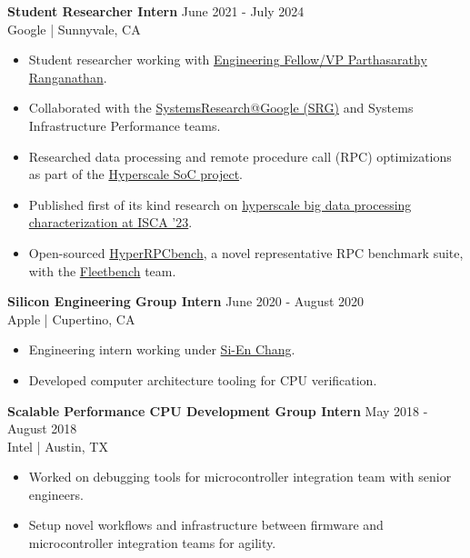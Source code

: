 \documentclass[line]{res}
\begin{document}
\begin{resume}
\textbf{Student Researcher Intern} \hfill June 2021 - July 2024
\\
Google | Sunnyvale, CA
\\
\vspace{-3mm}
\begin{itemize}
\item Student researcher working with \href{https://www.parthasarathys.com/}{Engineering Fellow/VP Parthasarathy Ranganathan}.
\item Collaborated with the \href{https://techsysinfra.google/research/}{SystemsResearch@Google (SRG)} and Systems Infrastructure Performance teams.
\item Researched data processing and remote procedure call (RPC) optimizations as part of the \hyperref[sec:hyperscale-soc]{Hyperscale SoC project}.
\item Published first of its kind research on \href{https://dl.acm.org/doi/10.1145/3579371.3589082}{hyperscale big data processing characterization at ISCA '23}.
\item Open-sourced \href{https://github.com/google/fleetbench/tree/cd20746b68b307b148a761c676d6400f2541082d/fleetbench/rpc}{HyperRPCbench}, a novel representative RPC benchmark suite, with the \href{https://github.com/google/fleetbench}{Fleetbench} team.
\end{itemize}

\vspace{-3mm}

\textbf{Silicon Engineering Group Intern} \hfill June 2020 - August 2020
\\
Apple | Cupertino, CA
\\
\vspace{-3mm}
\begin{itemize}
\item Engineering intern working under \href{https://www.linkedin.com/in/sienchang/}{Si-En Chang}.
\item Developed computer architecture tooling for CPU verification.
\end{itemize}

\vspace{-3mm}

\textbf{Scalable Performance CPU Development Group Intern} \hfill May 2018 - August 2018
\\
Intel | Austin, TX
\\
\vspace{-3mm}
\begin{itemize}
\item Worked on debugging tools for microcontroller integration team with senior engineers.
\item Setup novel workflows and infrastructure between firmware and microcontroller integration teams for agility.
\end{itemize}


\end{resume}
\end{document}
